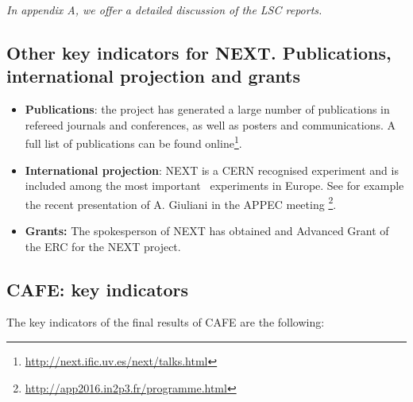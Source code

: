 \documentclass[a4paper,11pt,oneside]{article}
\begin{document}
{\em
In appendix A, we offer a detailed discussion of the LSC reports. 
}

\subsection*{Other key indicators for NEXT. Publications, international projection and grants}

\begin{itemize}
\item {\bf Publications}: the project has generated a large number of publications in refereed journals and conferences, as well as posters and communications. A full list of publications can be found online\footnote{\url{http://next.ific.uv.es/next/talks.html}}.
\item{\bf International projection}: NEXT is a CERN recognised experiment and is included among the most important
\bbonu\ experiments in Europe. See for example the recent presentation of A. Giuliani in the APPEC meeting \footnote{\url{http://app2016.in2p3.fr/programme.html}}.
\item{\bf Grants:} The spokesperson of NEXT has obtained and Advanced Grant of the ERC for the NEXT project. 
\end{itemize}

\subsection*{CAFE: key indicators}

%
The key indicators of the final results of CAFE are the following:
\end{document}
